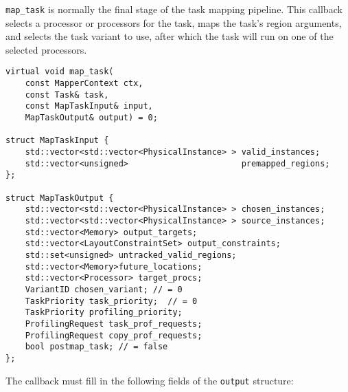 {\tt map\_task} is normally the final stage of the task mapping pipeline.  This callback selects a processor or processors for the task, maps the task's region arguments, and selects the task variant to use, after which the task will run on one of the selected processors.
\begin{lstlisting}
virtual void map_task(
    const MapperContext ctx,
    const Task& task,
    const MapTaskInput& input,
    MapTaskOutput& output) = 0;

struct MapTaskInput {
    std::vector<std::vector<PhysicalInstance> > valid_instances;
    std::vector<unsigned>                       premapped_regions;
};

struct MapTaskOutput {
    std::vector<std::vector<PhysicalInstance> > chosen_instances; 
    std::vector<std::vector<PhysicalInstance> > source_instances;
    std::vector<Memory> output_targets;
    std::vector<LayoutConstraintSet> output_constraints;
    std::set<unsigned> untracked_valid_regions;
    std::vector<Memory>future_locations;
    std::vector<Processor> target_procs;
    VariantID chosen_variant; // = 0 
    TaskPriority task_priority;  // = 0
    TaskPriority profiling_priority;
    ProfilingRequest task_prof_requests;
    ProfilingRequest copy_prof_requests;
    bool postmap_task; // = false
};
\end{lstlisting}
The callback must fill in the following fields of the {\tt output} structure:
